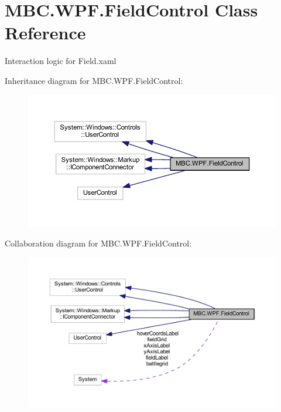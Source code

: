 \hypertarget{class_m_b_c_1_1_w_p_f_1_1_field_control}{\section{M\-B\-C.\-W\-P\-F.\-Field\-Control Class Reference}
\label{class_m_b_c_1_1_w_p_f_1_1_field_control}
}


Interaction logic for Field.\-xaml  




Inheritance diagram for M\-B\-C.\-W\-P\-F.\-Field\-Control\-:
\nopagebreak
\begin{figure}[H]
\begin{center}
\leavevmode
\includegraphics[width=350pt]{class_m_b_c_1_1_w_p_f_1_1_field_control__inherit__graph}
\end{center}
\end{figure}


Collaboration diagram for M\-B\-C.\-W\-P\-F.\-Field\-Control\-:
\nopagebreak
\begin{figure}[H]
\begin{center}
\leavevmode
\includegraphics[width=350pt]{class_m_b_c_1_1_w_p_f_1_1_field_control__coll__graph}
\end{center}
\end{figure}
